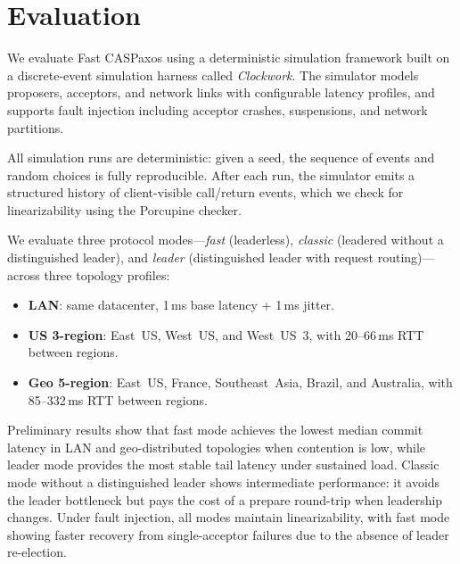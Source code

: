 \section{Evaluation}
\label{sec:evaluation}

We evaluate Fast CASPaxos using a deterministic simulation framework built on a discrete-event simulation harness called \emph{Clockwork}.
The simulator models proposers, acceptors, and network links with configurable latency profiles, and supports fault injection including acceptor crashes, suspensions, and network partitions.

All simulation runs are deterministic: given a seed, the sequence of events and random choices is fully reproducible.
After each run, the simulator emits a structured history of client-visible call/return events, which we check for linearizability using the Porcupine checker.

We evaluate three protocol modes---\emph{fast} (leaderless), \emph{classic} (leadered without a distinguished leader), and \emph{leader} (distinguished leader with request routing)---across three topology profiles:
\begin{itemize}
    \item \textbf{LAN}: same datacenter, 1\,ms base latency + 1\,ms jitter.
    \item \textbf{US 3-region}: East~US, West~US, and West~US~3, with 20--66\,ms RTT between regions.
    \item \textbf{Geo 5-region}: East~US, France, Southeast~Asia, Brazil, and Australia, with 85--332\,ms RTT between regions.
\end{itemize}


Preliminary results show that fast mode achieves the lowest median commit latency in LAN and geo-distributed topologies when contention is low, while leader mode provides the most stable tail latency under sustained load.
Classic mode without a distinguished leader shows intermediate performance: it avoids the leader bottleneck but pays the cost of a prepare round-trip when leadership changes.
Under fault injection, all modes maintain linearizability, with fast mode showing faster recovery from single-acceptor failures due to the absence of leader re-election.
